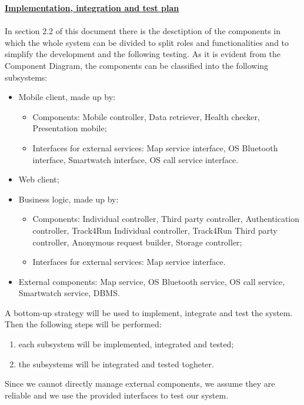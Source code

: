 	\underline{\textbf{Implementation, integration and test plan}}\\\\
In section 2.2 of this document there is the desctiption of the components in which the whole system can be divided to split roles and functionalities and to simplify the development and the following testing.
As it is evident from the Component Diagram, the components can be classified into the following subsystems:
	\begin{itemize}
	\item Mobile client, made up by:
		\begin{itemize}
		\item Components: Mobile controller,  Data retriever, Health checker, Presentation mobile;
		\item Interfaces for external services: Map service interface, OS Bluetooth interface, Smartwatch interface, OS call service interface.
		\end{itemize}
	\item Web client;
	\item Business logic, made up by:
		\begin{itemize}
		\item Components: Individual controller, Third party controller, Authentication controller, Track4Run Individual controller, Track4Run Third party controller, Anonymous request builder, Storage controller;
		\item Interfaces for external services: Map service interface.
		\end{itemize}
	\item External components: Map service, OS Bluetooth service, OS call service, Smartwatch service, DBMS.\\
	\end{itemize}

A bottom-up strategy will be used to implement, integrate and test the system. Then the following steps will be performed:
	\begin{enumerate} 
	\item each subsystem will be implemented, integrated and tested;
	\item the subsystems will be integrated and tested togheter.\\
	\end{enumerate}
Since we cannot directly manage external components, we assume they are reliable and we use the provided interfaces to test our system.\\

